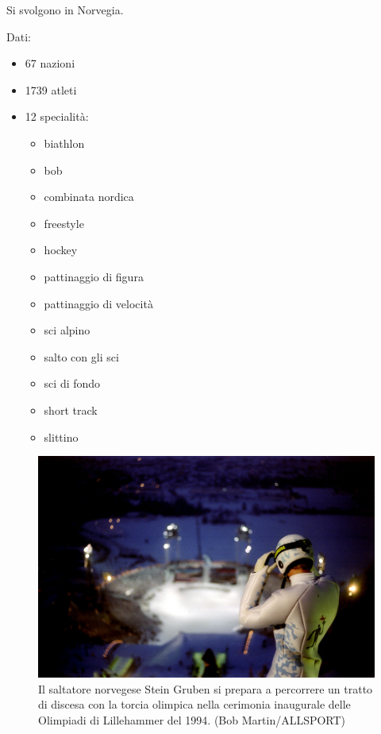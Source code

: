 \documentclass[
]{book}
\providecommand{\tightlist}{%
  \setlength{\itemsep}{0pt}\setlength{\parskip}{0pt}}
\begin{document}
Si svolgono in Norvegia.

Dati:

\begin{itemize}
\tightlist
\item
  67 nazioni
\item
  1739 atleti
\item
  12 specialità:

  \begin{itemize}
  \tightlist
  \item
    biathlon
  \item
    bob
  \item
    combinata nordica
  \item
    freestyle
  \item
    hockey
  \item
    pattinaggio di figura
  \item
    pattinaggio di velocità
  \item
    sci alpino
  \item
    salto con gli sci
  \item
    sci di fondo
  \item
    short track
  \item
    slittino
  \end{itemize}
\end{itemize}

\begin{figure}
\includegraphics[width=0.8\linewidth]{images/IlPost/1994} \caption{Il saltatore norvegese Stein Gruben si prepara a percorrere un tratto di discesa con la torcia olimpica nella cerimonia inaugurale delle Olimpiadi di Lillehammer del 1994. (Bob Martin/ALLSPORT)}\label{fig:unnamed-chunk-58}
\end{figure}
\end{document}
